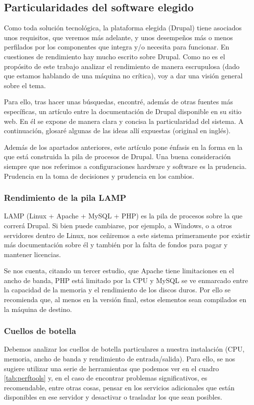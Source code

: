 \subsection{Particularidades del software elegido}
\par Como toda solución tecnológica, la plataforma elegida (Drupal) tiene asociados unos requisitos, que veremos más adelante, y unos desempeños más o menos perfilados por los componentes que integra y/o necesita para funcionar.
En cuestiones de rendimiento hay mucho escrito sobre Drupal. Como no es el propósito de este trabajo analizar el rendimiento de manera escrupulosa (dado que estamos hablando de una máquina no crítica), voy a dar una visión general sobre el tema.
\par Para ello, tras hacer unas búsquedas, encontré, además de otras fuentes más específicas\cite{references:drupalperf2bits}\cite{references:drupalperferikwebb}, un artículo\cite{references:drupalservertuning} entre la documentación de Drupal disponible en su sitio web. En él se expone de manera clara y concisa la particularidad del sistema. A continuación, glosaré algunas de las ideas allí expuestas (original en inglés).
\par Además de los apartados anteriores, este artículo pone énfasis en la forma en la que está construida la pila de procesos de Drupal. Una buena consideración siempre que nos referimos a configuraciones hardware y software es la prudencia. Prudencia en la toma de decisiones y prudencia en los cambios.
\subsubsection{Rendimiento de la pila LAMP}
\par LAMP (Linux + Apache + MySQL + PHP) es la pila de procesos sobre la que correrá Drupal. Si bien puede cambiarse, por ejemplo, a Windows, o a otros servidores dentro de Linux, nos ceñiremos a este sistema primeramente por existir más documentación sobre él y también por la falta de fondos para pagar y mantener licencias.
\par Se nos cuenta, citando un tercer estudio, que Apache tiene limitaciones en el ancho de banda, PHP está limitado por la CPU y MySQL se ve enmarcado entre la capacidad de la memoria y el rendimiento de los discos duros. Por ello se recomienda que, al menos en la versión final, estos elementos sean compilados en la máquina de destino.
\subsubsection{Cuellos de botella}
\par Debemos analizar los cuellos de botella particulares a nuestra instalación (CPU, memoria, ancho de banda y rendimiento de entrada/salida). Para ello, se nos sugiere utilizar una serie de herramientas que podemos ver en el cuadro \ref{tab:perftools} y, en el caso de encontrar problemas significativos, es recomendable, entre otras cosas, pensar en los servicios adicionales que están disponibles en ese servidor y desactivar o trasladar los que sean posibles.

